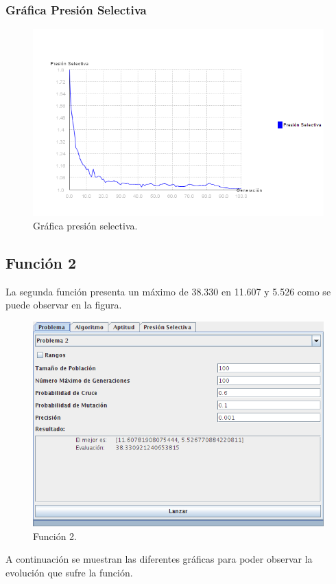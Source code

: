 \documentclass[12pt]{article}
\begin{document}
\subsubsection*{Gráfica Presión Selectiva}
\begin{figure}[H]
\centering
\includegraphics[scale=0.5]{graficas/F1inicial_presion}
\caption{Gráfica presión selectiva.}
\label{fig}
\end{figure}
\newpage

\subsection{Función 2}
	La segunda función presenta un máximo de 38.330 en 11.607 y 5.526 como se puede observar en la figura.
\begin{figure}[H]
\centering
\includegraphics[scale=0.5]{graficas/F2inicial}
\caption{Función 2.}
\label{fig}
\end{figure}
	A continuación se muestran las diferentes gráficas para poder observar la evolución que sufre la función.
\end{document}
